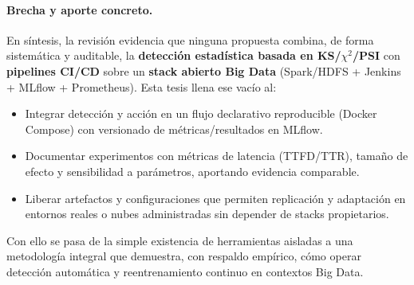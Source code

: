 \paragraph{Brecha y aporte concreto.}
En síntesis, la revisión evidencia que ninguna propuesta combina, de forma sistemática y auditable, la \textbf{detección estadística basada en KS/$\chi^2$/PSI} con \textbf{pipelines CI/CD} sobre un \textbf{stack abierto Big Data} (Spark/HDFS + Jenkins + MLflow + Prometheus). Esta tesis llena ese vacío al:
\begin{itemize}\setlength\itemsep{2pt}
  \item Integrar detección y acción en un flujo declarativo reproducible (Docker Compose) con versionado de métricas/resultados en MLflow.
  \item Documentar experimentos con métricas de latencia (TTFD/TTR), tamaño de efecto y sensibilidad a parámetros, aportando evidencia comparable.
  \item Liberar artefactos y configuraciones que permiten replicación y adaptación en entornos reales o nubes administradas sin depender de stacks propietarios.
\end{itemize}
Con ello se pasa de la simple existencia de herramientas aisladas a una metodología integral que demuestra, con respaldo empírico, cómo operar detección automática y reentrenamiento continuo en contextos Big Data.

